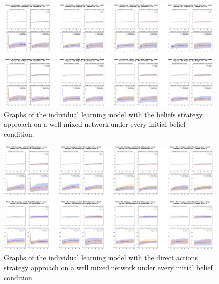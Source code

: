 \documentclass[]{llncs}
\begin{document}
\begin{figure}
\centering
\includegraphics[width=15cm]{images/individual_wellmixed1}
\caption{\label{individual_wellmixed1} Graphs of the individual learning model with the beliefs strategy approach on a well mixed network under every initial belief condition.}
\end{figure}
\begin{figure}
\centering
\includegraphics[width=15cm]{images/individual_wellmixed2}
\caption{\label{individual_wellmixed2} Graphs of the individual learning model with the direct actions strategy approach on a well mixed network under every initial belief condition.}
\end{figure}
\end{document}
